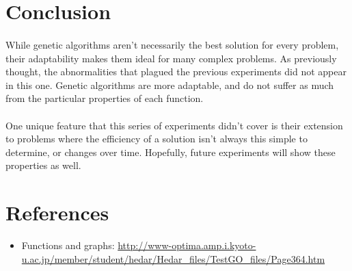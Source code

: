 \documentclass{article}
\begin{document}
    \section{Conclusion}
    \paragraph{}
    While genetic algorithms aren't necessarily the best solution for every problem, their adaptability makes them ideal for many complex problems. As previously thought, the abnormalities that plagued the previous experiments did not appear in this one. Genetic algorithms are more adaptable, and do not suffer as much from the particular properties of each function.
    \paragraph{}
    One unique feature that this series of experiments didn't cover is their extension to problems where the efficiency of a solution isn't always this simple to determine, or changes over time. Hopefully, future experiments will show these properties as well.

    \section{References}
    \begin{itemize}
        \item Functions and graphs: \url{http://www-optima.amp.i.kyoto-u.ac.jp/member/student/hedar/Hedar_files/TestGO_files/Page364.htm}
    \end{itemize}
\end{document}
